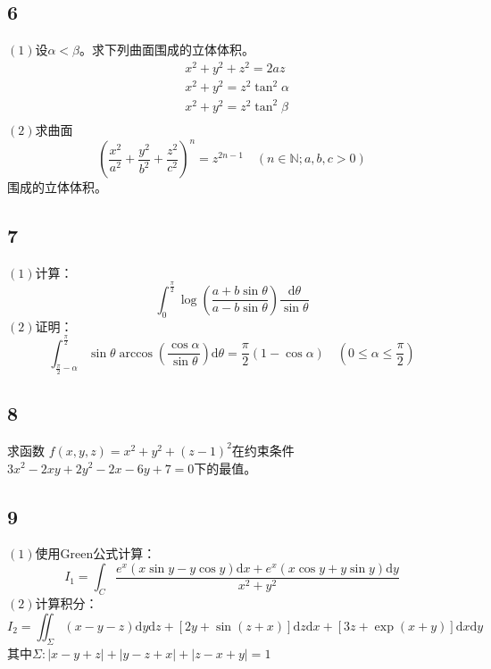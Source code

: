 \documentclass[a4paper,12pt]{article}
\begin{document}
\subsection*{6}\noindent$\left(1\right)$设$\alpha<\beta$。求下列曲面围成的立体体积。\begin{equation*}\begin{aligned}
	&x^2+y^2+z^2=2az\\
	&x^2+y^2=z^2\tan^2\alpha\\
	&x^2+y^2=z^2\tan^2\beta\\	
	\end{aligned}
\end{equation*}
\noindent$\left(2\right)$求曲面
\begin{equation*}
	\left(\frac{x^2}{a^2}+\frac{y^2}{b^2}+\frac{z^2}{c^2}\right)^{n}=z^{2n-1}\quad\left(n\in\mathbb{N};a,b,c>0\right)
\end{equation*}
围成的立体体积。
\subsection*{7}\noindent$\left(1\right)$计算：
\begin{equation*}
	\int_{0}^{\frac{\pi}{2}}\log\left(\frac{a+b\sin\theta}{a-b\sin\theta}\right)\frac{\mathrm{d}\theta}{\sin\theta}
\end{equation*}
\noindent$\left(2\right)$证明：
\begin{equation*}
	\int_{\frac{\pi}{2}-\alpha}^{\frac{\pi}{2}}\sin\theta\arccos\left(\frac{\cos\alpha}{\sin\theta}\right)\mathrm{d}\theta=\frac{\pi}{2}\left(1-\cos\alpha\right)\quad\left(0\leq\alpha\leq\frac{\pi}{2}\right)
\end{equation*}
\subsection*{8}\noindent 求函数
$f\left(x,y,z\right)=x^2+y^2+\left(z-1\right)^2$在约束条件$3x^2-2xy+2y^2-2x-6y+7=0$下的最值。
\subsection*{9}\noindent$\left(1\right)$使用Green公式计算：
\begin{equation*}
	I_{1}=\int_{C}\frac{e^x\left(x\sin y-y\cos y \right)\mathrm{d}x+e^{x}\left(x\cos y+y\sin y\right)\mathrm{d}y}{x^2+y^2}
\end{equation*}
\noindent$\left(2\right)$计算积分：
\begin{equation*}
	I_{2}=\iint_{\Sigma}\left(x-y-z\right)\mathrm{d}y\mathrm{d}z+\left[2y+\sin\left(z+x\right)\right]\mathrm{d}z\mathrm{d}x+\left[3z+\exp\left(x+y\right)\right]\mathrm{d}x\mathrm{d}y
\end{equation*}
其中$\Sigma:\left|x-y+z\right|+\left|y-z+x\right|+\left|z-x+y\right|=1$
\end{document}
